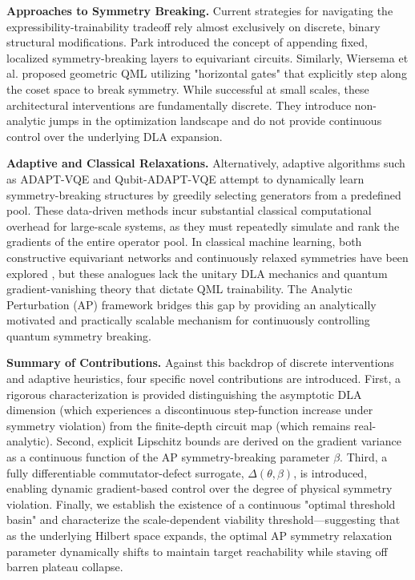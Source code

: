 \documentclass[pdflatex,sn-mathphys-num]{sn-jnl}
\theoremstyle{thmstyleone}
\theoremstyle{thmstyletwo}
\theoremstyle{thmstylethree}
\begin{document}
\textbf{Approaches to Symmetry Breaking.} Current strategies for navigating the expressibility-trainability tradeoff rely almost exclusively on discrete, binary structural modifications. Park \cite{park2021symmetry, park2024symmetry} introduced the concept of appending fixed, localized symmetry-breaking layers to equivariant circuits. Similarly, Wiersema et al. \cite{wiersema2025geometric} proposed geometric QML utilizing "horizontal gates" that explicitly step along the coset space to break symmetry. While successful at small scales, these architectural interventions are fundamentally discrete. They introduce non-analytic jumps in the optimization landscape and do not provide continuous control over the underlying DLA expansion. 

\textbf{Adaptive and Classical Relaxations.} Alternatively, adaptive algorithms such as ADAPT-VQE and Qubit-ADAPT-VQE \cite{grimsley2019adapt,tang2021qubit} attempt to dynamically learn symmetry-breaking structures by greedily selecting generators from a predefined pool. These data-driven methods incur substantial classical computational overhead for large-scale systems, as they must repeatedly simulate and rank the gradients of the entire operator pool. In classical machine learning, both constructive equivariant networks and continuously relaxed symmetries have been explored \cite{finzi2021practical,vanderouderaa2022relaxed,kossaifi2024continuous}, but these analogues lack the unitary DLA mechanics and quantum gradient-vanishing theory that dictate QML trainability. The Analytic Perturbation (AP) framework bridges this gap by providing an analytically motivated and practically scalable mechanism for continuously controlling quantum symmetry breaking.

\textbf{Summary of Contributions.} Against this backdrop of discrete interventions and adaptive heuristics, four specific novel contributions are introduced. First, a rigorous characterization is provided distinguishing the asymptotic DLA dimension (which experiences a discontinuous step-function increase under symmetry violation) from the finite-depth circuit map (which remains real-analytic). Second, explicit Lipschitz bounds are derived on the gradient variance as a continuous function of the AP symmetry-breaking parameter $\beta$. Third, a fully differentiable commutator-defect surrogate, $\Delta(\theta, \beta)$, is introduced, enabling dynamic gradient-based control over the degree of physical symmetry violation. Finally, we establish the existence of a continuous "optimal threshold basin" and characterize the scale-dependent viability threshold---suggesting that as the underlying Hilbert space expands, the optimal AP symmetry relaxation parameter dynamically shifts to maintain target reachability while staving off barren plateau collapse.
\end{document}

